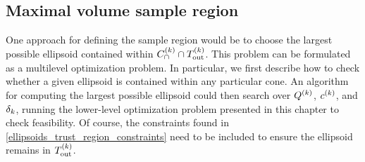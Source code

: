 
%





%
%  
%


\subsection{Maximal volume sample region}
\label{ideal_ellipsoid_in_polyhedron}
\label{ellipsoid_in_cone}


One approach for defining the sample region would be to choose the largest possible ellipsoid contained within ${C^{(k)}_{\cap}} \cap {T_{\text{out}}^{(k)}}$.   
This problem can be formulated as a multilevel optimization problem.
In particular, we first describe how to check whether a given ellipsoid is contained within any particular cone.
An algorithm for computing the largest possible ellipsoid could then search over ${Q^{(k)}}$, $c^{(k)}$, and $\delta_k$, running the
lower-level optimization problem presented in this chapter to check feasibility.
Of course, the constraints found in \cref{ellipsoids_trust_region_constraints} need to be included to ensure the ellipsoid remains in ${T_{\text{out}}^{(k)}}$.


